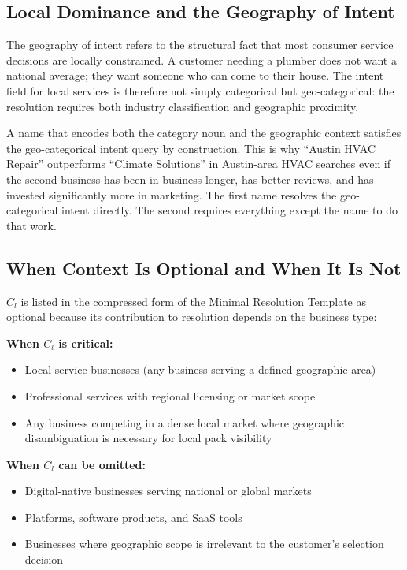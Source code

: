 \documentclass[12pt, openany]{book}
\theoremstyle{thmstyle}
\theoremstyle{defstyle}
\newcommand{\Cl}{C_l}
\begin{document}
\subsection{Local Dominance and the Geography of Intent}

The geography of intent refers to the structural fact that most consumer service decisions are locally constrained. A customer needing a plumber does not want a national average; they want someone who can come to their house. The intent field for local services is therefore not simply categorical but geo-categorical: the resolution requires both industry classification and geographic proximity.

A name that encodes both the category noun and the geographic context satisfies the geo-categorical intent query by construction. This is why ``Austin HVAC Repair'' outperforms ``Climate Solutions'' in Austin-area HVAC searches even if the second business has been in business longer, has better reviews, and has invested significantly more in marketing. The first name resolves the geo-categorical intent directly. The second requires everything except the name to do that work.

\subsection{When Context Is Optional and When It Is Not}

$\Cl$ is listed in the compressed form of the Minimal Resolution Template as optional because its contribution to resolution depends on the business type:

\textbf{When $\Cl$ is critical:}
\begin{itemize}[leftmargin=1.5em]
  \item Local service businesses (any business serving a defined geographic area)
  \item Professional services with regional licensing or market scope
  \item Any business competing in a dense local market where geographic disambiguation is necessary for local pack visibility
\end{itemize}

\textbf{When $\Cl$ can be omitted:}
\begin{itemize}[leftmargin=1.5em]
  \item Digital-native businesses serving national or global markets
  \item Platforms, software products, and SaaS tools
  \item Businesses where geographic scope is irrelevant to the customer's selection decision
\end{itemize}
\end{document}
